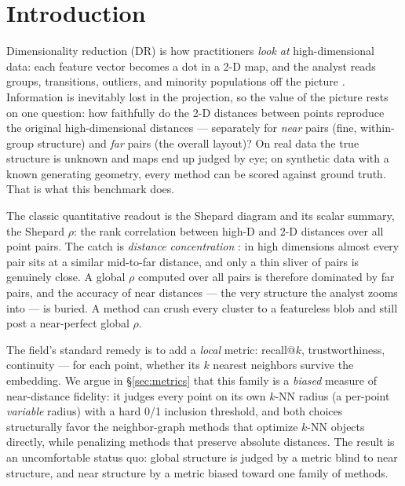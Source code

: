 \documentclass[11pt]{article}
\begin{document}
\section{Introduction}
\label{sec:intro}

Dimensionality reduction (DR) is how practitioners \emph{look at}
high-dimensional data: each feature vector becomes a dot in a 2-D map, and
the analyst reads groups, transitions, outliers, and minority populations off
the picture \cite{vandermaaten2008tsne,mcinnes2018umap,espadoto2019survey}.
Information is inevitably lost in the projection, so the value of the picture
rests on one question: how faithfully do the 2-D distances between points
reproduce the original high-dimensional distances --- separately for
\emph{near} pairs (fine, within-group structure) and \emph{far} pairs (the
overall layout)? On real data the true structure is unknown and maps end up
judged by eye; on synthetic data with a known generating geometry, every
method can be scored against ground truth. That is what this benchmark does.

The classic quantitative readout is the Shepard diagram \cite{shepard1962}
and its scalar summary, the Shepard $\rho$: the rank correlation between
high-D and 2-D distances over all point pairs. The catch is \emph{distance
concentration} \cite{beyer1999nearest,aggarwal2001surprising}: in high
dimensions almost every pair sits at a similar mid-to-far distance, and only
a thin sliver of pairs is genuinely close. A global $\rho$ computed over all
pairs is therefore dominated by far pairs, and the accuracy of near
distances --- the very structure the analyst zooms into --- is buried. A
method can crush every cluster to a featureless blob and still post a
near-perfect global $\rho$.

The field's standard remedy is to add a \emph{local} metric: recall@$k$,
trustworthiness, continuity \cite{venna2006trustworthiness,
lee2009qualityassessment} --- for each point, whether its $k$ nearest
neighbors survive the embedding. We argue in \S\ref{sec:metrics} that this
family is a \emph{biased} measure of near-distance fidelity: it judges every
point on its own $k$-NN radius (a per-point \emph{variable} radius) with a
hard 0/1 inclusion threshold, and both choices structurally favor the
neighbor-graph methods that optimize $k$-NN objects directly, while
penalizing methods that preserve absolute distances. The result is an
uncomfortable status quo: global structure is judged by a metric blind to
near structure, and near structure by a metric biased toward one family of
methods.
\end{document}
